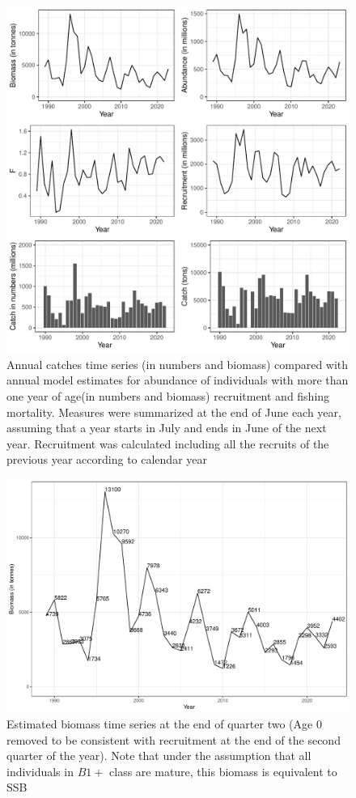 \documentclass[review]{elsarticle}
\begin{document}
\begin{figure}[h!]
 \centering
 \includegraphics[bb=0 0 518 523]{./ICESplots.pdf}
 \caption{Annual catches time series (in numbers and biomass) compared with annual model estimates for abundance of individuals with more than one year of age(in numbers and biomass) recruitment and fishing mortality. Measures were summarized at the end of June each year, assuming that a year starts in July and ends in June of the next year. Recruitment was calculated including all the recruits of the previous year according to calendar year}
 \label{ICESplot}
\end{figure}
\begin{figure}[h!]
 \centering
 \includegraphics[bb=0 0 662 451]{./biomassts.pdf}
 \caption{Estimated biomass time series at the end of quarter two (Age 0 removed to be consistent with recruitment at the end of the second quarter of the year). Note that under the assumption that all individuals in $B1+$ class are mature, this biomass is equivalent to SSB}
 \label{biomassts}
\end{figure}
\end{document}
